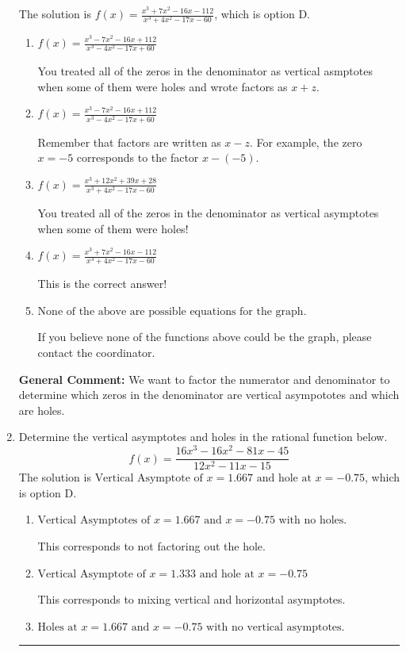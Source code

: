 \documentclass{extbook}[14pt]
\newcommand{\litem}[1]{\item #1

\rule{\textwidth}{0.4pt}}
\begin{document}
\begin{enumerate}
{The solution is \( f(x)=\frac{x^{3} +7 x^{2} -16 x -112}{x^{3} +4 x^{2} -17 x -60} \), which is option D.\begin{enumerate}[label=\Alph*.]
\item \( f(x)=\frac{x^{3} -7 x^{2} -16 x + 112}{x^{3} -4 x^{2} -17 x + 60} \)

You treated all of the zeros in the denominator as vertical asmptotes when some of them were holes and wrote factors as $x+z$.
\item \( f(x)=\frac{x^{3} -7 x^{2} -16 x + 112}{x^{3} -4 x^{2} -17 x + 60} \)

Remember that factors are written as $x-z$. For example, the zero $x=-5$ corresponds to the factor $x-(-5)$.
\item \( f(x)=\frac{x^{3} +12 x^{2} +39 x + 28}{x^{3} +4 x^{2} -17 x -60} \)

You treated all of the zeros in the denominator as vertical asymptotes when some of them were holes!
\item \( f(x)=\frac{x^{3} +7 x^{2} -16 x -112}{x^{3} +4 x^{2} -17 x -60} \)

This is the correct answer!
\item \( \text{None of the above are possible equations for the graph.} \)

If you believe none of the functions above could be the graph, please contact the coordinator.
\end{enumerate}

\textbf{General Comment:} We want to factor the numerator and denominator to determine which zeros in the denominator are vertical asympototes and which are holes.
}
\litem{
Determine the vertical asymptotes and holes in the rational function below.
\[ f(x) = \frac{16x^{3} -16 x^{2} -81 x -45}{12x^{2} -11 x -15} \]The solution is \( \text{Vertical Asymptote of } x = 1.667 \text{ and hole at } x = -0.75 \), which is option D.\begin{enumerate}[label=\Alph*.]
\item \( \text{Vertical Asymptotes of } x = 1.667 \text{ and } x = -0.75 \text{ with no holes.} \)

This corresponds to not factoring out the hole.
\item \( \text{Vertical Asymptote of } x = 1.333 \text{ and hole at } x = -0.75 \)

This corresponds to mixing vertical and horizontal asymptotes.
\item \( \text{Holes at } x = 1.667 \text{ and } x = -0.75 \text{ with no vertical asymptotes.} \)


\end{enumerate}}
\end{enumerate}
\end{document}
